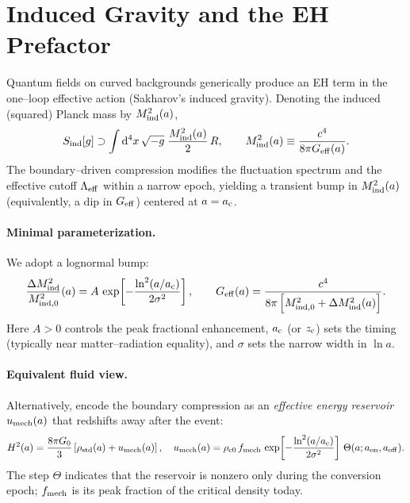 \documentclass[11pt,a4paper]{article}
\newcommand{\Geff}{G_{\rm eff}}
\newcommand{\ac}{a_{\rm c}}
\newcommand{\zc}{z_{\rm c}}
\newcommand{\dx}{\mathrm{d}}
\newcommand{\be}{\begin{equation}}
\newcommand{\ee}{\end{equation}}
\begin{document}
\section{Induced Gravity and the EH Prefactor}
Quantum fields on curved backgrounds generically produce an EH term in the one--loop effective action (Sakharov's induced gravity). Denoting the induced (squared) Planck mass by $M_{\rm ind}^2(a)$,
\be
S_{\rm ind}[g] \supset \int \dx^4 x\, \sqrt{-g}\;\frac{M_{\rm ind}^2(a)}{2}\,R,
\qquad
M_{\rm ind}^2(a)\equiv \frac{c^4}{8\pi \Geff(a)}.
\ee
The boundary--driven compression modifies the fluctuation spectrum and the effective cutoff $\Lambda_{\rm eff}$ within a narrow epoch, yielding a transient bump in $M_{\rm ind}^2(a)$ (equivalently, a dip in $\Geff$) centered at $a=\ac$.

\paragraph{Minimal parameterization.}
We adopt a lognormal bump:
\be
\frac{\Delta M_{\rm ind}^2}{M_{\rm ind,0}^2}(a)
= A\,\exp\!\left[-\frac{\ln^2(a/\ac)}{2\sigma^2}\right],
\qquad
\Geff(a)=\frac{c^4}{8\pi \left[ M_{\rm ind,0}^2+\Delta M_{\rm ind}^2(a)\right]}.
\label{eq:Geff}
\ee
Here $A>0$ controls the peak fractional enhancement, $\ac$ (or $\zc$) sets the timing (typically near matter--radiation equality), and $\sigma$ sets the narrow width in $\ln a$.

\paragraph{Equivalent fluid view.}
Alternatively, encode the boundary compression as an \emph{effective energy reservoir} $u_{\rm mech}(a)$ that redshifts away after the event:
\be
H^2(a) = \frac{8\pi G_0}{3}\left[\rho_{\rm std}(a)+u_{\rm mech}(a)\right],\quad
u_{\rm mech}(a)=\rho_{\rm c0}\,f_{\rm mech}\,\exp\!\left[-\frac{\ln^2(a/\ac)}{2\sigma^2}\right]\,\Theta(a;a_{\rm on},a_{\rm off}).
\ee
The step $\Theta$ indicates that the reservoir is nonzero only during the conversion epoch; $f_{\rm mech}$ is its peak fraction of the critical density today.
\end{document}
